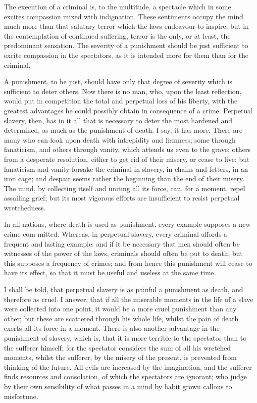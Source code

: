 The execution of a criminal is, to the multitude, a spectacle which in
some excites compassion mixed with indignation. These sentiments
occupy the mind much more than that salutary terror which the laws
endeavour to inspire; but in the contemplation of continued suffering,
terror is the only, or at least, the predominant sensation. 
The severity of a punishment should be just sufficient to excite
compassion in the spectators, as it is intended more for them than for
the criminal.

A punishment, to be just, should have only that degree of severity
which is sufficient to deter others. Now there is no man, who, upon
the least reflection, would put in competition the total and perpetual
loss of his liberty, with the greatest advantages he could possibly
obtain in consequence of a crime. Perpetual slavery, then, has in it
all that is necessary to deter the most hardened and determined, as
much as the punishment of death. I say, it has more. There are many
who can look upon death with intrepidity and firmness; some through
fanaticism, and others through vanity, which attends us even to the
grave; others from a desperate resolution, either to get rid of their
misery, or cease to live: but fanaticism and vanity forsake the
criminal in slavery, in chains and fetters, in an iron cage; and
despair seems rather the beginning than the end of their misery. The
mind, by collecting itself and uniting all its force, can, for a
moment, repel assailing grief; but its most vigorous efforts are
insufficient to resist perpetual wretchedness.

In all nations, where death is used as punishment, every example
supposes a new crime com-mitted. Whereas, in perpetual
slavery, every criminal affords a frequent and lasting example: and if
it be necessary that men should often be witnesses of the power of the
laws, criminals should often be put to death; but this supposes a
frequency of crimes; and from hence this punishment will cease to have
its effect, so that it must be useful and useless at the same time.


I shall be told, that perpetual slavery is as painful a punishment as
death, and therefore as cruel. I answer, that if all the miserable
moments in the life of a slave were collected into one point, it would
be a more cruel punishment than any other; but these are scattered
through his whole life, whilst the pain of death exerts all its force
in a moment. There is also another advantage in the punishment of
slavery, which is, that it is more terrible to the spectator than to
the sufferer himself; for the spectator considers the sum of all his
wretched moments, whilst the sufferer, by the misery of the present,
is prevented from thinking of the future. All evils are increased by
the imagination, and the sufferer finds resources and consolation, of
which the spectators are ignorant; who judge by their own sensibility
of what passes in a mind by habit grown callous to misfortune.

